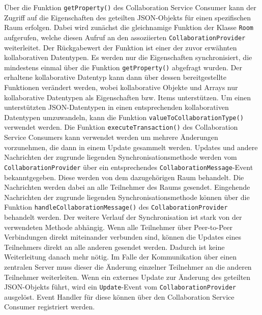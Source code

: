 Über die Funktion \texttt{getProperty()} des Collaboration Service Consumer kann der Zugriff auf die Eigenschaften des geteilten JSON-Objekts für einen spezifischen Raum erfolgen. Dabei wird zunächst die gleichnamige Funktion der Klasse \texttt{Room} aufgerufen, welche diesen Aufruf an den assoziierten \texttt{CollaborationProvider} weiterleitet. Der Rückgabewert der Funktion ist einer der zuvor erwähnten kollaborativen Datentypen. Es werden nur die Eigenschaften synchronisiert, die mindestens einmal über die Funktion \texttt{getProperty()} abgefragt wurden. Der erhaltene kollaborative Datentyp kann dann über dessen bereitgestellte Funktionen verändert werden, wobei kollaborative Objekte und Arrays nur kollaborative Datentypen als Eigenschaften bzw. Items unterstützen. Um einen unterstützten JSON-Datentypen in einen entsprechenden kollaborativen Datentypen umzuwandeln, kann die Funktion \texttt{valueToCollaborationType()} verwendet werden. Die Funktion \texttt{executeTransaction()} des Collaboration Service Consumers kann verwendet werden um mehrere Änderungen vorzunehmen, die dann in einem Update gesammelt werden. Updates und andere Nachrichten der zugrunde liegenden Synchronisationsmethode werden vom \texttt{CollaborationProvider} über ein entsprechendes \texttt{CollaborationMessage}-Event bekanntgegeben. Diese werden von dem dazugehörigen Raum behandelt. Die Nachrichten werden dabei an alle Teilnehmer des Raums gesendet. Eingehende Nachrichten der zugrunde liegenden Synchronisationsmethode können über die Funktion \texttt{handleCollaborationMessage()} des \texttt{CollaborationProvider} behandelt werden. Der weitere Verlauf der Synchronisation ist stark von der verwendeten Methode abhängig. Wenn alle Teilnehmer über Peer-to-Peer Verbindungen direkt miteinander verbunden sind, können die Updates eines Teilnehmers direkt an alle anderen gesendet werden. Dadurch ist keine Weiterleitung danach mehr nötig. Im Falle der Kommunikation über einen zentralen Server muss dieser die Änderung einzelner Teilnehmer an die anderen Teilnehmer weiterleiten. Wenn ein externes Update zur Änderung des geteilten JSON-Objekts führt, wird ein \texttt{Update}-Event vom \texttt{CollaborationProvider} ausgelöst. Event Handler für diese können über den Collaboration Service Consumer registriert werden.

